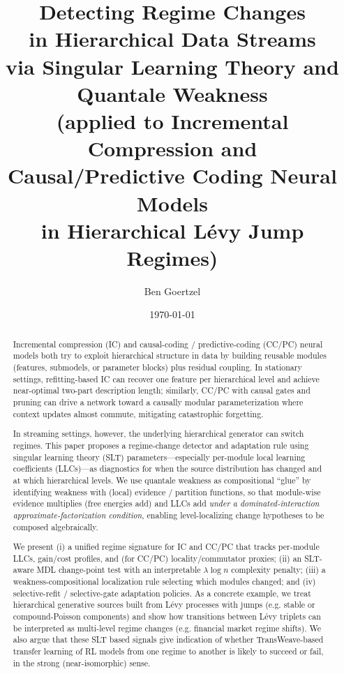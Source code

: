 \documentclass[11pt]{article}
\title{ {\huge Detecting Regime Changes\\ in Hierarchical Data Streams\\ via Singular Learning Theory
and Quantale Weakness} \\ (applied to Incremental Compression and \\ Causal/Predictive Coding Neural Models\\
in Hierarchical L\'evy Jump Regimes)}
\author{Ben Goertzel}
\date{\today}
\begin{document}
\maketitle

\begin{abstract}
Incremental compression (IC) and causal-coding / predictive-coding (CC/PC) neural models
both try to exploit hierarchical structure in data by building reusable modules (features, submodels,
or parameter blocks) plus residual coupling.
In stationary settings, refitting-based IC can recover one feature per hierarchical level and achieve
near-optimal two-part description length; similarly, CC/PC with causal gates and pruning can drive
a network toward a causally modular parameterization where context updates almost commute,
mitigating catastrophic forgetting.

In streaming settings, however, the underlying hierarchical generator can switch regimes.
This paper proposes a regime-change detector and adaptation rule using singular learning theory (SLT)
parameters---especially per-module local learning coefficients (LLCs)---as diagnostics for when the
source distribution has changed and at which hierarchical levels. We use quantale weakness as
compositional ``glue'' by identifying weakness with (local) evidence / partition functions, so that
module-wise evidence multiplies (free energies add) and LLCs add \emph{under a dominated-interaction
approximate-factorization condition}, enabling level-localizing change hypotheses to be composed algebraically.

We present (i) a unified regime signature for IC and CC/PC that tracks per-module LLCs, gain/cost
profiles, and (for CC/PC) locality/commutator proxies; (ii) an SLT-aware MDL change-point test
with an interpretable $\lambda \log n$ complexity penalty; (iii) a weakness-compositional localization
rule selecting which modules changed; and (iv) selective-refit / selective-gate adaptation policies.
As a concrete example, we treat hierarchical generative sources built from L\'evy processes with jumps
(e.g. stable or compound-Poisson components) and show how transitions between L\'evy triplets
can be interpreted as multi-level regime changes (e.g. financial market regime shifts).   We also argue that these
SLT based signals give indication of whether TransWeave-based transfer learning of RL models from one regime to another is likely to succeed or fail, in the strong (near-isomorphic) sense.
\end{abstract}
\end{document}
